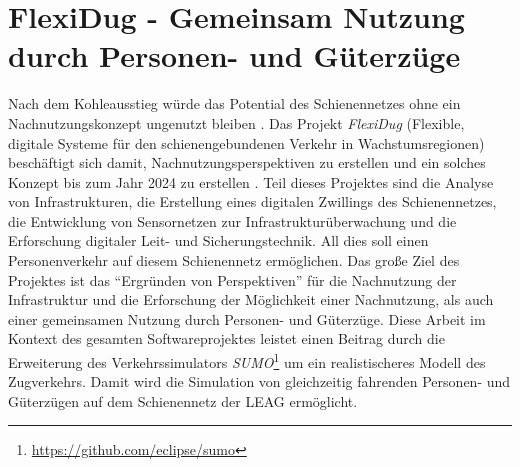 \section{FlexiDug - Gemeinsam Nutzung durch Personen- und Güterzüge}

Nach dem Kohleausstieg würde das Potential des Schienennetzes ohne ein Nachnutzungskonzept ungenutzt bleiben \cite{rbb_hpi_2022}. Das Projekt \emph{FlexiDug} (Flexible, digitale Systeme für den schienengebundenen Verkehr in Wachstumsregionen) beschäftigt sich damit, Nachnutzungsperspektiven zu erstellen und ein solches Konzept bis zum Jahr 2024 zu erstellen \cite{hasso_plattner_institut_flexidug_2022}. Teil dieses Projektes sind die Analyse von Infrastrukturen, die Erstellung eines digitalen Zwillings des Schienennetzes, die Entwicklung von Sensornetzen zur Infrastrukturüberwachung und die Erforschung digitaler Leit- und Sicherungstechnik. All dies soll einen Personenverkehr auf diesem Schienennetz ermöglichen. Das große Ziel des Projektes ist das \enquote{Ergründen von Perspektiven} für die Nachnutzung der Infrastruktur und die Erforschung der Möglichkeit einer Nachnutzung, als auch einer gemeinsamen Nutzung durch Personen- und Güterzüge. \cite{rbb_hpi_2022} Diese Arbeit im Kontext des gesamten Softwareprojektes leistet einen Beitrag durch die Erweiterung des Verkehrssimulators \emph{SUMO}\footnote{\url{https://github.com/eclipse/sumo}} um ein realistischeres Modell des Zugverkehrs. Damit wird die Simulation von gleichzeitig fahrenden Personen- und Güterzügen auf dem Schienennetz der LEAG ermöglicht.